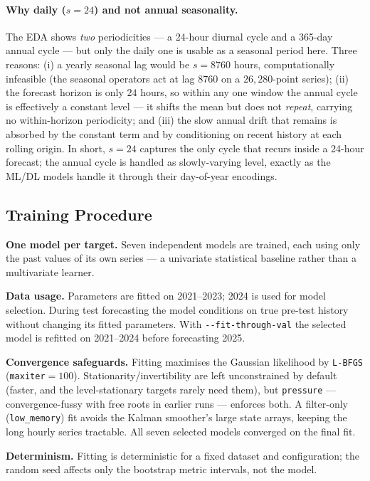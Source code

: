 \documentclass[12pt,a4paper,oneside]{report}
\begin{document}
\paragraph{Why daily ($s{=}24$) and not annual seasonality.}
The EDA shows \emph{two} periodicities --- a 24-hour diurnal cycle and a 365-day
annual cycle --- but only the daily one is usable as a seasonal period here. Three
reasons: (i) a yearly seasonal lag would be $s = 8760$ hours, computationally
infeasible (the seasonal operators act at lag $8760$ on a $26{,}280$-point series);
(ii) the forecast horizon is only $24$ hours, so within any one window the annual
cycle is effectively a constant level --- it shifts the mean but does not
\emph{repeat}, carrying no within-horizon periodicity; and (iii) the slow annual
drift that remains is absorbed by the constant term and by conditioning on recent
history at each rolling origin. In short, $s{=}24$ captures the only cycle that
recurs inside a 24-hour forecast; the annual cycle is handled as slowly-varying
level, exactly as the ML/DL models handle it through their day-of-year encodings.

\subsection{Training Procedure}
\textbf{One model per target.} Seven independent models are trained, each using
only the past values of its own series --- a univariate statistical baseline
rather than a multivariate learner.

\textbf{Data usage.} Parameters are fitted on 2021--2023; 2024 is used for model
selection. During test forecasting the model conditions on true pre-test history
without changing its fitted parameters. With \texttt{-{}-fit-through-val} the
selected model is refitted on 2021--2024 before forecasting 2025.

\textbf{Convergence safeguards.} Fitting maximises the Gaussian likelihood by
\texttt{L-BFGS} (\texttt{maxiter}$=100$). Stationarity/invertibility are left
unconstrained by default (faster, and the level-stationary targets rarely need
them), but \texttt{pressure} --- convergence-fussy with free roots in earlier
runs --- enforces both. A filter-only (\texttt{low\_memory}) fit avoids the
Kalman smoother's large state arrays, keeping the long hourly series tractable.
All seven selected models converged on the final fit.

\textbf{Determinism.} Fitting is deterministic for a fixed dataset and
configuration; the random seed affects only the bootstrap metric intervals, not
the model.
\end{document}
